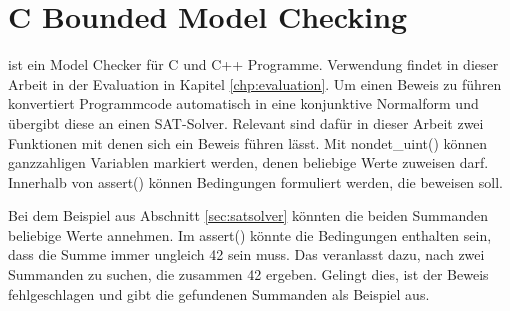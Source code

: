 \section{C Bounded Model Checking}
\label{sec:cbmc}

 ist ein Model Checker für C und C++ Programme. Verwendung findet  in dieser Arbeit in der Evaluation in Kapitel \ref{chp:evaluation}.
Um einen Beweis zu führen konvertiert  Programmcode automatisch in eine konjunktive Normalform und übergibt diese an einen SAT-Solver.
Relevant sind dafür in dieser Arbeit zwei Funktionen mit denen sich ein Beweis führen lässt. Mit nondet\_uint() können ganzzahligen Variablen markiert
werden, denen  beliebige Werte zuweisen darf. Innerhalb von assert() können Bedingungen formuliert werden, die  beweisen soll.

Bei dem Beispiel aus Abschnitt \ref{sec:satsolver} könnten die beiden Summanden beliebige Werte annehmen. Im assert() könnte die Bedingungen enthalten sein,
dass die Summe immer ungleich 42 sein muss. Das veranlasst  dazu, nach zwei Summanden zu suchen, die zusammen 42 ergeben. Gelingt dies, ist der
Beweis fehlgeschlagen und  gibt die gefundenen Summanden als Beispiel aus.
